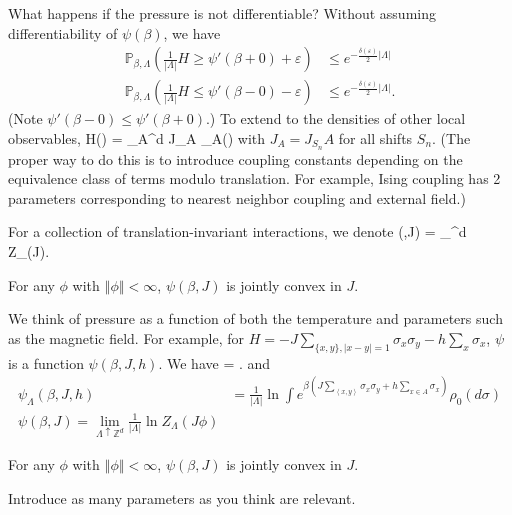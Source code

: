 What happens if the pressure is not differentiable?
Without assuming differentiability of $\psi(\beta)$, we have 
\begin{align*}
\mathbb{P}_{\beta,\Lambda} \left( {\frac{1}{|\Lambda|} H \ge \psi'(\beta+0) + \varepsilon} \right)&\le e^{-\frac{\delta(\varepsilon)}{2}|\Lambda|}\\
\mathbb{P}_{\beta,\Lambda} \left( {\frac{1}{|\Lambda|} H \le  \psi'(\beta-0) -\varepsilon} \right) &\le e^{-\frac{\delta(\varepsilon)}{2}|\Lambda|}.
\end{align*}
(Note $\psi'(\beta-0)\le \psi'(\beta+0)$.) To extend to the densities of other local observables,
\be
H(\sigma) = \sum_{A\subseteq {}^d} J_A \phi_A(\sigma)
\ee
with $J_A = J_{S_n}A$ for all shifts $S_n$. 
(The proper way to do this is to introduce coupling constants depending on the equivalence class of terms modulo translation. For example, Ising coupling has 2 parameters corresponding to nearest neighbor coupling and external field.)

For a collection of translation-invariant interactions, we denote 
\be
\psi(\beta,J) = \lim_{\lambda \uparrow {}^d}  \ln Z_{\Lambda}(J\phi).
\ee
\begin{theorem}
For any $\phi$ with $\left\Vert {\phi}\right\Vert<\infty$, 
$
\psi(\beta, J) 
$
is jointly convex in $J$. 
\end{theorem}
We think of pressure as a function of both the temperature and parameters such as the magnetic field.
For example, for $H=-J\sum_{\{x,y\},|x-y|=1} \sigma_x\sigma_y - h\sum_x \sigma_x$, %
$\psi$ is a function $\psi(\beta, J,h)$. We have
\be
{} = \beta\left{}\right\rangle.
\ee
and
\begin{align*}
\psi_{\Lambda}(\beta, J, h) &= \frac{1}{|\Lambda|} \ln \int e^{\beta(J\sum_{\left\langle {x,y}\right\rangle} \sigma_x\sigma_y+ h\sum_{x\in A} \sigma_x)}\rho_0(d\sigma)\\
\psi(\beta,J) = \lim_{\Lambda\uparrow \mathbb{Z}^d} \frac{1}{|\Lambda|}\ln Z_{\Lambda}(J\phi)
\end{align*}
\begin{theorem}
For any $\phi$ with $\left\Vert {\phi}\right\Vert<\infty$, $\psi(\beta,J)$ is jointly convex in $J$.
\end{theorem}
Introduce as many parameters as you think are relevant.


